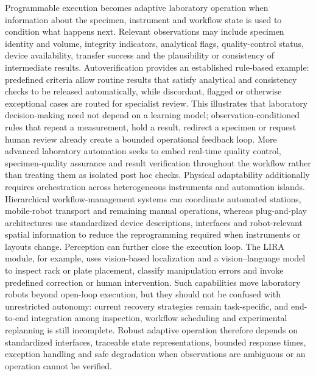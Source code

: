 \documentclass[12pt,a4paper]{article}
\begin{document}
Programmable execution becomes adaptive laboratory operation when information about the specimen, instrument and workflow state is used to condition what happens next. Relevant observations may include specimen identity and volume, integrity indicators, analytical flags, quality-control status, device availability, transfer success and the plausibility or consistency of intermediate results. Autoverification provides an established rule-based example: predefined criteria allow routine results that satisfy analytical and consistency checks to be released automatically, while discordant, flagged or otherwise exceptional cases are routed for specialist review. This illustrates that laboratory decision-making need not depend on a learning model; observation-conditioned rules that repeat a measurement, hold a result, redirect a specimen or request human review already create a bounded operational feedback loop. More advanced laboratory automation seeks to embed real-time quality control, specimen-quality assurance and result verification throughout the workflow rather than treating them as isolated post hoc checks. Physical adaptability additionally requires orchestration across heterogeneous instruments and automation islands. Hierarchical workflow-management systems can coordinate automated stations, mobile-robot transport and remaining manual operations, whereas plug-and-play architectures use standardized device descriptions, interfaces and robot-relevant spatial information to reduce the reprogramming required when instruments or layouts change. Perception can further close the execution loop. The LIRA module, for example, uses vision-based localization and a vision--language model to inspect rack or plate placement, classify manipulation errors and invoke predefined correction or human intervention. Such capabilities move laboratory robots beyond open-loop execution, but they should not be confused with unrestricted autonomy: current recovery strategies remain task-specific, and end-to-end integration among inspection, workflow scheduling and experimental replanning is still incomplete. Robust adaptive operation therefore depends on standardized interfaces, traceable state representations, bounded response times, exception handling and safe degradation when observations are ambiguous or an operation cannot be verified.
\end{document}
